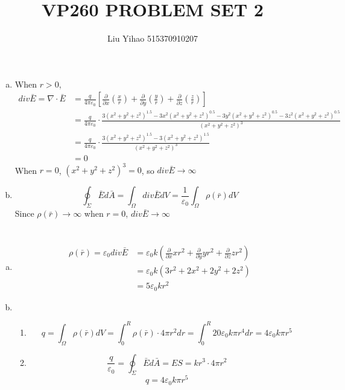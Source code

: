 \documentclass{article}
\title{VP260 PROBLEM SET 2}
\author{Liu Yihao 515370910207}
\date{}
\begin{document}
\maketitle

\section{}
\begin{enumerate}[(a)]
\item
When $r>0$,
\begin{align*}
div\bar{E}=\nabla\cdot\bar{E}&=\frac{q}{4\pi\varepsilon_0}\left[\frac{\partial}{\partial x}\left(\frac{x}{r}\right)+\frac{\partial}{\partial y}\left(\frac{y}{r}\right)+\frac{\partial}{\partial z}\left(\frac{z}{r}\right)\right]\\
&=\frac{q}{4\pi\varepsilon_0}\cdot\frac{3(x^2+y^2+z^2)^{1.5}-3x^2(x^2+y^2+z^2)^{0.5}-3y^2(x^2+y^2+z^2)^{0.5}-3z^2(x^2+y^2+z^2)^{0.5}}{(x^2+y^2+z^2)^{3}}\\
&=\frac{q}{4\pi\varepsilon_0}\cdot\frac{3(x^2+y^2+z^2)^{1.5}-3(x^2+y^2+z^2)^{1.5}}{(x^2+y^2+z^2)^{3}}\\
&=0
\end{align*}
When $r=0$, $(x^2+y^2+z^2)^{3}=0$, so $div\bar{E}\to\infty$
\item
$$\oint_{\Sigma}\bar{E}d\bar{A}=\int_{\Omega}div\bar{E}dV=\frac{1}{\varepsilon_0}\int_{\Omega}\rho(\bar{r})dV$$
Since $\rho(\bar{r})\to\infty$ when $r=0$, $div\bar{E}\to\infty$
\end{enumerate}

\section{}
\begin{enumerate}[(a)]
\item
\begin{align*}
\rho(\bar{r})=\varepsilon_0div\bar{E}&=\varepsilon_0k\left(\frac{\partial}{\partial x}xr^2+\frac{\partial}{\partial y}yr^2+\frac{\partial}{\partial z}zr^2\right)\\
&=\varepsilon_0k(3r^2+2x^2+2y^2+2z^2)\\
&=5\varepsilon_0kr^2
\end{align*}
\item
\begin{enumerate}[(1)]
\item
$$q=\int_{\Omega}\rho(\bar{r})dV=\int_0^R\rho(\bar{r})\cdot4\pi r^2dr=\int_0^R20\varepsilon_0k\pi r^4dr=4\varepsilon_0k\pi r^5$$
\item
$$\frac{q}{\varepsilon_0}=\oint_{\Sigma}\bar{E}d\bar{A}=ES=kr^3\cdot4\pi r^2$$
$$q=4\varepsilon_0k\pi r^5$$
\end{enumerate}
\end{enumerate}
\end{document}
